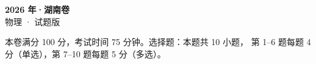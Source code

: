 \documentclass[zihao=-4, a4paper]{ctexart}
\begin{document}
\begin{center}
  {\Large\bfseries 2026 年·湖南卷}\\[4pt]
  {\large 物理 · 试题版}
\end{center}
\medskip
\begin{gknotice}
  本卷满分 100 分，考试时间 75 分钟。选择题：本题共 10 小题，
  第 1--6 题每题 4 分（单选），第 7--10 题每题 5 分（多选）。
\end{gknotice}

\end{document}
